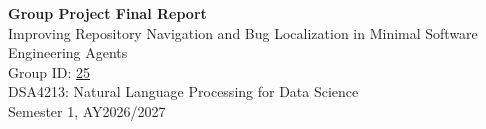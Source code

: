 \documentclass[11pt]{article}
\newcommand{\course}{DSA4213: Natural Language Processing for Data Science}
\newcommand{\semester}{Semester 1, AY2026/2027}
\begin{document}
\begin{center}
{\LARGE\bfseries Group Project Final Report}\\[0.4em]
{\large Improving Repository Navigation and Bug Localization in Minimal Software Engineering Agents}\\[0.9em]
Group ID: \underline{25}\\[0.9em]
\course\\
\semester
\end{center}

\clearpage






\appendix
\end{document}
